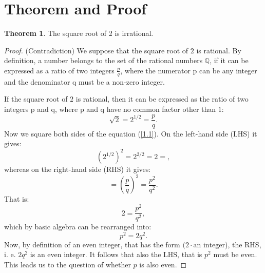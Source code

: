 \documentclass[11pt]{amsart}
\theoremstyle{definition}
\newtheorem{theorem}{Theorem}
\begin{document}
\section{Theorem and Proof}
\begin{theorem}
    The square root of 2 is irrational.
\end{theorem}
\begin{proof}
    (Contradiction) We suppose that the square root of \(2\) is rational.
    By definition, a number belongs to the set of the rational numbers \(\mathbb{Q}\), if it can be expressed as a ratio of two integers  \(\frac{p}{q}\), where the numerator p can be any integer and the denominator q must be a non-zero integer.

    If the square root of \(2\) is rational, then it can be expressed as the ratio of two integers p and q, where p and q have no common factor other than \(1\):
    \begin{equation}\label{1.1}
        \sqrt{2} = 2^{1/2} = \frac{p}{q}.
    \end{equation}
    Now we square both sides of the equation (\ref{1.1}). On the left-hand side (LHS) it gives:
    \begin{equation}\label{1.2}
        \left(2^{1/2}\right)^{2} = 2^{2/2} = 2 =,
    \end{equation}
    whereas on the right-hand side (RHS) it gives:
    \begin{equation}\label{1.3}
        = \left(\frac{p}{q}\right)^{2} = \frac{p^2}{q^2}.
    \end{equation}
    That is:
    \begin{equation}\label{1.4}
        2 = \frac{p^2}{q^2},
    \end{equation}
    which by basic algebra can be rearranged into:
    \begin{equation}\label{1.5}
        p^{2} = 2q^{2}.
    \end{equation}
    Now, by definition of an even integer, that has the form \((2 \cdot \text{an integer}\)), the RHS, i. e. \(2q^{2}\) is an even integer. It follows that also the LHS, that is \(p^{2}\) must be even. This leads us to the question of whether \(p\) is also even.


\end{proof}
\end{document}
